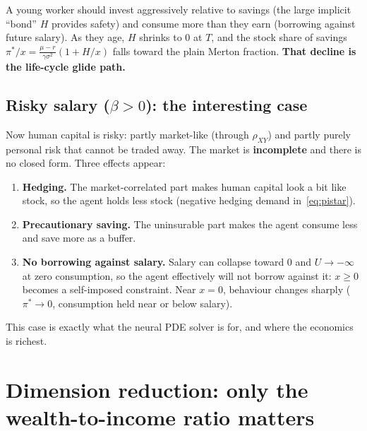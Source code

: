 \documentclass[11pt]{article}
\newcommand{\rxy}{\rho_{XY}}
\begin{document}
\begin{keyidea}
A young worker should invest aggressively relative to savings (the large implicit
``bond'' $H$ provides safety) and consume more than they earn (borrowing against
future salary). As they age, $H$ shrinks to $0$ at $T$, and the stock share of
savings $\pi^*/x = \frac{\mu-r}{\gamma\sigma^2}(1 + H/x)$ falls toward the plain
Merton fraction. \textbf{That decline is the life-cycle glide path.}
\end{keyidea}

\subsection{Risky salary ($\beta>0$): the interesting case}
Now human capital is risky: partly market-like (through $\rxy$) and partly purely
personal risk that cannot be traded away. The market is \textbf{incomplete} and
there is no closed form. Three effects appear:
\begin{enumerate}
  \item \textbf{Hedging.} The market-correlated part makes human capital look a bit
        like stock, so the agent holds less stock (negative hedging demand
        in~\eqref{eq:pistar}).
  \item \textbf{Precautionary saving.} The uninsurable part makes the agent consume
        less and save more as a buffer.
  \item \textbf{No borrowing against salary.} Salary can collapse toward $0$ and
        $U\to-\infty$ at zero consumption, so the agent effectively will not borrow
        against it: $x\ge0$ becomes a self-imposed constraint. Near $x=0$, behaviour
        changes sharply ($\pi^*\to0$, consumption held near or below salary).
\end{enumerate}
This case is exactly what the neural PDE solver is for, and where the economics is
richest.

\section{Dimension reduction: only the wealth-to-income ratio matters}
\end{document}

